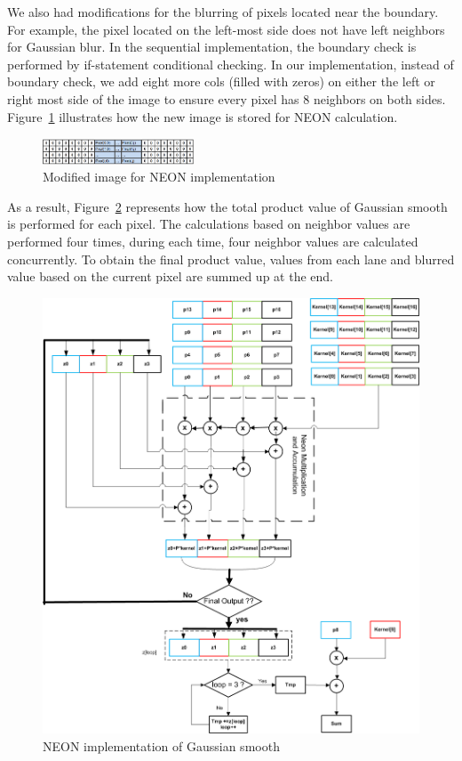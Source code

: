 We also had modifications for the blurring of pixels located near the boundary. For example, the pixel located on the left-most side does not have left neighbors for Gaussian blur. In the sequential implementation, the boundary check is performed by if-statement conditional checking. In our implementation, instead of boundary check, we add eight more cols (filled with zeros) on either the left or right most side of the image to ensure every pixel has 8 neighbors on both sides. Figure~\ref{fig:addcols} illustrates how the new image is stored for NEON calculation. 

\begin{figure}
\centering
\includegraphics[width=0.4\textwidth]{drawings/new_cols}
\caption{Modified image for NEON implementation}
\label{fig:addcols}
\end{figure}

As a result, Figure~\ref{fig:neon} represents how the total product value of Gaussian smooth is performed for each pixel. The calculations based on neighbor values are performed four times, during each time, four neighbor values are calculated concurrently. To obtain the final product value, values from each lane and blurred value based on the current pixel are summed up at the end.

\begin{figure}
\centering
\includegraphics[width=0.6\linewidth]{drawings/neon}
\caption{NEON implementation of Gaussian smooth}
\label{fig:neon}
\end{figure}
